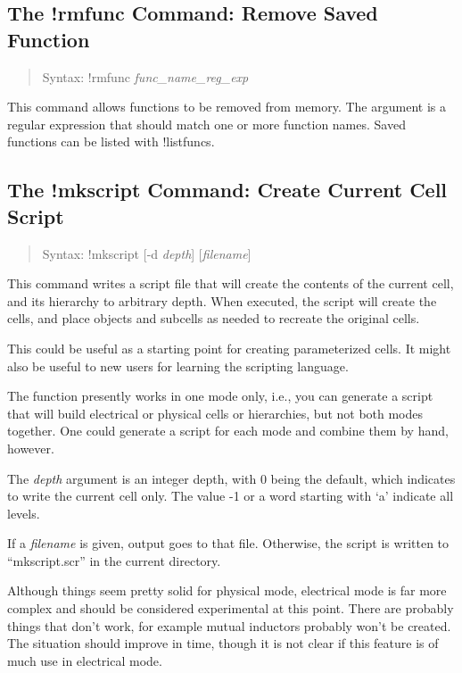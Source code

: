 \subsection{The {\cb !rmfunc} Command: Remove Saved Function}
\begin{quote}
Syntax: {\vt !rmfunc} {\it func\_name\_reg\_exp}
\end{quote}
This command allows functions to be removed from memory.  The argument
is a regular expression that should match one or more function names. 
Saved functions can be listed with {\cb !listfuncs}.

\subsection{The {\cb !mkscript} Command: Create Current Cell Script}
\begin{quote}
Syntax: {\vt !mkscript} [{\vt -d} {\it depth\/}] [{\it filename\/}]
\end{quote}
This command writes a script file that will create the contents of the
current cell, and its hierarchy to arbitrary depth.  When executed,
the script will create the cells, and place objects and subcells as
needed to recreate the original cells.

This could be useful as a starting point for creating parameterized
cells.  It might also be useful to new users for learning the
scripting language.

The function presently works in one mode only, i.e., you can generate
a script that will build electrical or physical cells or hierarchies,
but not both modes together.  One could generate a script for each
mode and combine them by hand, however.

The {\it depth} argument is an integer depth, with 0 being the
default, which indicates to write the current cell only.  The value -1
or a word starting with `a' indicate all levels.

If a {\it filename} is given, output goes to that file.  Otherwise,
the script is written to ``{\vt mkscript.scr}'' in the current
directory.

Although things seem pretty solid for physical mode, electrical mode
is far more complex and should be considered experimental at this
point.  There are probably things that don't work, for example mutual
inductors probably won't be created.  The situation should improve in
time, though it is not clear if this feature is of much use in
electrical mode.

